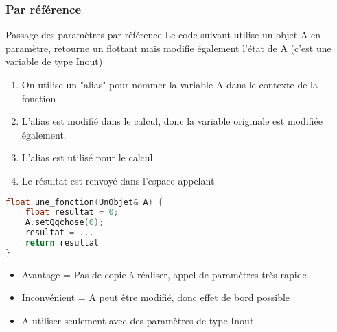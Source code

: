 \documentclass{beamer}
\begin{document}
\begin{frame}[fragile=singleslide,shrink=20]
\frametitle {Par référence}

\begin{block}{Passage des paramètres par référence}
Le code suivant utilise un objet A en paramètre, retourne un flottant mais modifie également l'état de A (c'est une variable de type Inout)
\begin{enumerate}
\item On utilise un "alias" pour nommer la variable A dans le contexte de la fonction
\item L'alias est modifié dans le calcul, donc la variable originale est modifiée également.
\item L'alias est utilisé pour le calcul
\item Le résultat est renvoyé dans l'espace appelant
\end{enumerate}
\end{block}

\begin{lstlisting}[language=c++]
float une_fonction(UnObjet& A) {
    float resultat = 0;
    A.setQqchose(0);
    resultat = ...
    return resultat
}
\end{lstlisting}

\begin{block}{}
\begin{itemize}
\item Avantage = Pas de copie à réaliser, appel de paramètres très rapide
\item Inconvénient = A peut être modifié, donc effet de bord possible
\item A utiliser seulement avec des paramètres de type Inout
\end{itemize}
\end{block}
\end{frame}
\end{document}
